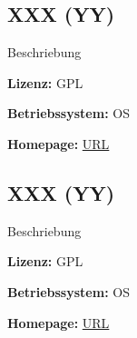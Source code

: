 \documentclass[12pt,a4paper,landscape,twocolumn]{article}
\newcommand{\software}[6]{
\subsection*{#1 (#2)}
\begin{compactitem}
\item #3
\item \textbf{Lizenz:} #4
\item \textbf{Betriebssystem:} #5
\item \textbf{Homepage:} \url{#6}
\end{compactitem} 
}
\begin{document}


\software{XXX}{YY}
{Beschriebung}
{GPL}
{OS}
{URL} 


\newpage %


\software{XXX}{YY}
{Beschriebung}
{GPL}
{OS}
{URL} 
\end{document}
